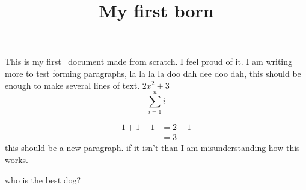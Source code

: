 \documentclass[11pt]{ximera}
\title{My first born}
\begin{document}
This is my first \LaTex\ document made  from scratch. I feel proud of it. I am writing more to test forming paragraphs, la la la la doo dah dee doo dah, this should be enough to make several lines of text. $2x^2+3$
\[
\sum_{i=1}^n i
\]

\begin{align*}
1+1+1 &= 2+1\\
&=3
\end{align*}
this should be a new paragraph. if it isn't than I am misunderstanding how this works.

\begin{question}
who is the best dog?
\begin{multipleChoice}
\end{multipleChoice}
\end{question}
\end{document}
